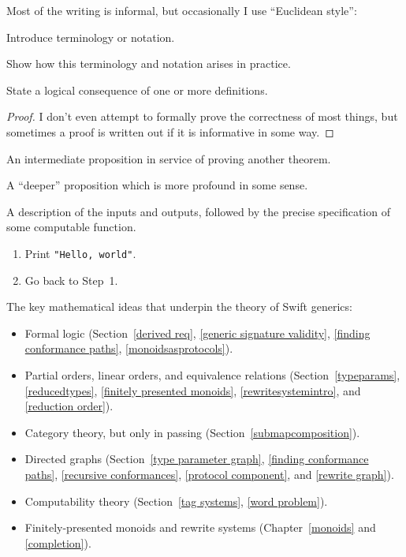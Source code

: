 \documentclass[../generics]{subfiles}
\begin{document}
Most of the writing is informal, but occasionally I use ``Euclidean style'':
\begin{definition}
Introduce terminology or notation.
\end{definition}
\begin{example}
Show how this terminology and notation arises in practice.
\end{example}
\begin{proposition}
State a logical consequence of one or more definitions.
\end{proposition}
\begin{proof}
I don't even attempt to formally prove the correctness of most things, but sometimes a proof is written out if it is informative in some way.
\end{proof}
\begin{lemma} An intermediate proposition in service of proving another theorem.
\end{lemma}
\begin{theorem} A ``deeper'' proposition which is more profound in some sense.
\end{theorem}
\begin{algorithmx} A description of the inputs and outputs, followed by the precise specification of some computable function.
\begin{enumerate}
\item Print \texttt{"Hello, world"}.
\item Go back to Step~1.
\end{enumerate}
\end{algorithmx}
\noindent The key mathematical ideas that underpin the theory of Swift generics:
\begin{itemize}
\item Formal logic (Section~\ref{derived req}, \ref{generic signature validity}, \ref{finding conformance paths}, \ref{monoidsasprotocols}).
\item Partial orders, linear orders, and equivalence relations (Section~\ref{typeparams}, \ref{reducedtypes},  \ref{finitely presented monoids}, \ref{rewritesystemintro}, and \ref{reduction order}).
\item Category theory, but only in passing (Section~\ref{submapcomposition}).
\item Directed graphs (Section~\ref{type parameter graph}, \ref{finding conformance paths}, \ref{recursive conformances}, \ref{protocol component}, and \ref{rewrite graph}).
\item Computability theory (Section~\ref{tag systems}, \ref{word problem}).
\item Finitely-presented monoids and rewrite systems (Chapter~\ref{monoids} and \ref{completion}).
\end{itemize}
\end{document}
